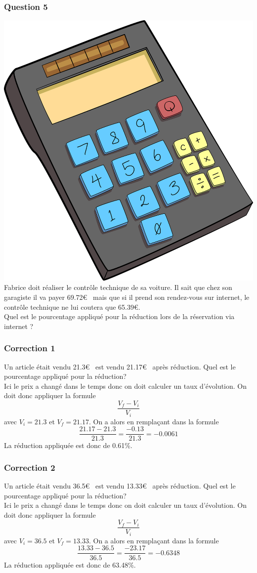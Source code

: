 \documentclass[15pt, mathserif]{beamer}
\begin{document}
\begin{frame} 
	\frametitle{Question 5}
\includegraphics[scale=0.01]{calculatrice}Fabrice doit réaliser le contrôle technique de sa voiture. Il sait que chez son garagiste il va payer 69.72\euro ~ mais que si il prend son rendez-vous sur internet, le contrôle technique ne lui coutera que  65.39\euro. \\ Quel est le pourcentage appliqué pour la réduction lors de la réservation via internet ? \end{frame}


\begin{frame}
\vspace{-10mm}
	\frametitle{Correction 1}
Un article était vendu 21.3\euro ~ est vendu 21.17\euro ~ après réduction. Quel est le pourcentage appliqué pour la réduction? \\ Ici le prix a changé dans le temps donc on doit calculer un taux d'évolution. On doit donc appliquer la formule $$\dfrac{V_f-V_i}{V_i}$$ avec $V_i =21.3$ et $V_f=21.17$. On a alors en remplaçant dans la formule $$\dfrac{21.17-21.3}{21.3}= \dfrac{-0.13}{21.3}=-0.0061$$ La réduction appliquée est donc de 0.61\%.\end{frame}


\begin{frame}
\vspace{-10mm}
	\frametitle{Correction 2}
Un article était vendu 36.5\euro ~ est vendu 13.33\euro ~ après réduction. Quel est le pourcentage appliqué pour la réduction? \\ Ici le prix a changé dans le temps donc on doit calculer un taux d'évolution. On doit donc appliquer la formule $$\dfrac{V_f-V_i}{V_i}$$ avec $V_i =36.5$ et $V_f=13.33$. On a alors en remplaçant dans la formule $$\dfrac{13.33-36.5}{36.5}= \dfrac{-23.17}{36.5}=-0.6348$$ La réduction appliquée est donc de 63.48\%.\end{frame}
\end{document}
